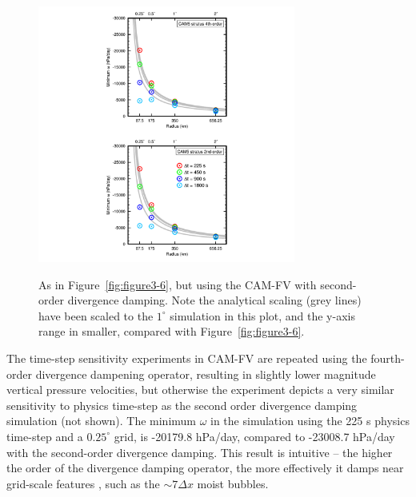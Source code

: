 \begin{figure}
\begin{center}
\noindent\includegraphics[width=20pc,angle=0]{chapter3/Figure7_crop.pdf}\\
\end{center}
\caption{As in Figure~\ref{fig:figure3-6}, but using the CAM-FV with second-order divergence damping. Note the analytical scaling (grey lines) have been scaled to the $1^{\circ}$ simulation in this plot, and the y-axis range in smaller, compared with Figure~\ref{fig:figure3-6}.}
\label{fig:figure3-7}
\end{figure}

The time-step sensitivity experiments in CAM-FV are repeated using the fourth-order divergence dampening operator, resulting in slightly lower magnitude vertical pressure velocities, but otherwise the experiment depicts a very similar sensitivity to physics time-step as the second order divergence damping simulation (not shown). The minimum $\omega$ in the simulation using the 225 s physics time-step and a $0.25^{\circ}$ grid, is -20179.8 hPa/day, compared to -23008.7 hPa/day with the second-order divergence damping. This result is intuitive – the higher the order of the divergence damping operator, the more effectively it damps near grid-scale features \citep{WJRL2010MWR}, such as the $\sim 7 \Delta x$ moist bubbles.

